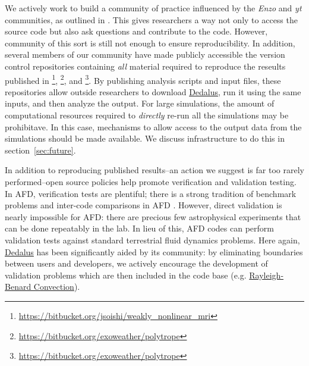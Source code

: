 \documentclass[12pt, titlepage]{aastex62}
\newcommand{\dedalus}{\href{http://dedalus-project.org}{Dedalus}}
\begin{document}
We actively work to build a community of practice influenced by the \emph{Enzo} and \emph{yt} communities, as outlined in \citet{2013arXiv1301.7064T}. This gives researchers a way not only to access the source code but also ask questions and contribute to the code. However, community of this sort is still not enough to ensure reproducibility. In addition, several members of our community have made publicly accessible the version control repositories containing \emph{all} material required to reproduce the reseults published in \citet{2017ApJ...841....1C,2017ApJ...841....2C}\footnote{\url{https://bitbucket.org/jsoishi/weakly_nonlinear_mri}}, \citet{2017PhRvF...2h3501A}\footnote{\url{https://bitbucket.org/exoweather/polytrope}}, and \citet{2018Bordwell}\footnote{\url{https://bitbucket.org/exoweather/polytrope}}. By publishing analysis scripts and input files, these repositories allow outside researchers to download \dedalus{}, run it using the same inputs, and then analyze the output. For large simulations, the amount of computational resources required to \emph{directly} re-run all the simulations may be prohibitave. In this case, mechanisms to allow access to the output data from the simulations should be made available. We discuss infrastructure to do this in section~\ref{sec:future}.


In addition to reproducing published results--an action we suggest is far too rarely performed--open source policies help promote verification and validation testing. In AFD, verification tests are plentiful; there is a strong tradition of benchmark problems and inter-code comparisons in AFD \citep[e.g.][among many others]{2001JGR...106.3715B,2014GeoJI.197..119M,2014ApJS..210...14K,2016MNRAS.455.4274L}. However, direct validation is nearly impossible for AFD: there are precious few astrophysical experiments that can be done repeatably in the lab. In lieu of this, AFD codes can perform validation tests against standard terrestrial fluid dynamics problems. Here again, \dedalus{} has been significantly aided by its community: by eliminating boundaries between users and developers, we actively encourage the development of validation problems which are then included in the code base (e.g. \href{https://bitbucket.org/dedalus-project/dedalus/src/cf57edf1516b931bc4ad0a7895d06219bbe90414/examples/ivp/3d_rayleigh_benard/rayleigh_benard.py?at=default&fileviewer=file-view-default}{Rayleigh-Benard Convection}). 
\end{document}
